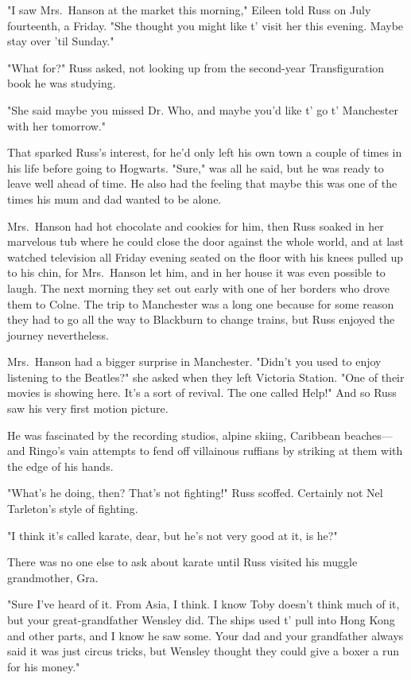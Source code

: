 "I saw Mrs.~Hanson at the market this morning," Eileen told Russ on July fourteenth, a Friday. "She thought you might like t' visit her this evening. Maybe stay over 'til Sunday."

"What for?" Russ asked, not looking up from the second-year Transfiguration book he was studying.

"She said maybe you missed Dr. Who, and maybe you'd like t' go t' Manchester with her tomorrow."

That sparked Russ's interest, for he'd only left his own town a couple of times in his life before going to Hogwarts. "Sure," was all he said, but he was ready to leave well ahead of time. He also had the feeling that maybe this was one of the times his mum and dad wanted to be alone.

Mrs.~Hanson had hot chocolate and cookies for him, then Russ soaked in her marvelous tub where he could close the door against the whole world, and at last watched television all Friday evening seated on the floor with his knees pulled up to his chin, for Mrs.~Hanson let him, and in her house it was even possible to laugh. The next morning they set out early with one of her borders who drove them to Colne. The trip to Manchester was a long one because for some reason they had to go all the way to Blackburn to change trains, but Russ enjoyed the journey nevertheless.

Mrs.~Hanson had a bigger surprise in Manchester. "Didn't you used to enjoy listening to the Beatles?" she asked when they left Victoria Station. "One of their movies is showing here. It's a sort of revival. The one called Help!" And so Russ saw his very first motion picture.

He was fascinated by the recording studios, alpine skiing, Caribbean beaches—and Ringo's vain attempts to fend off villainous ruffians by striking at them with the edge of his hands.

"What's he doing, then? That's not fighting!" Russ scoffed. Certainly not Nel Tarleton's style of fighting.

"I think it's called karate, dear, but he's not very good at it, is he?"

There was no one else to ask about karate until Russ visited his muggle grandmother, Gra.

"Sure I've heard of it. From Asia, I think. I know Toby doesn't think much of it, but your great-grandfather Wensley did. The ships used t' pull into Hong Kong and other parts, and I know he saw some. Your dad and your grandfather always said it was just circus tricks, but Wensley thought they could give a boxer a run for his money."


